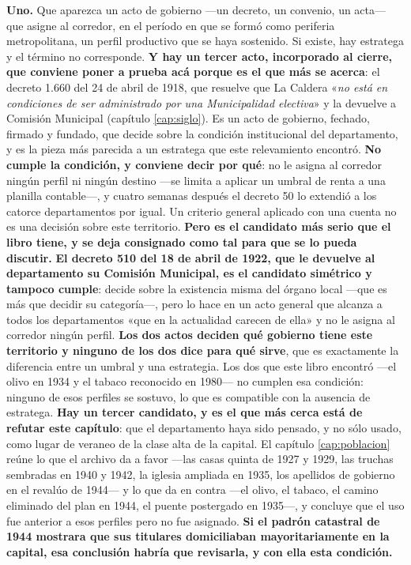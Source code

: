 \textbf{Uno.} Que aparezca un acto de gobierno ---un decreto, un convenio, un acta--- que asigne al corredor, en el período en que se formó como periferia metropolitana, un perfil productivo que se haya sostenido. Si existe, hay estratega y el término no corresponde. \textbf{Y hay un tercer acto, incorporado al cierre, que conviene poner a prueba acá porque es el
que más se acerca}: el decreto 1.660 del 24 de abril de 1918, que resuelve que La Caldera
«\textit{no está en condiciones de ser administrado por una Municipalidad electiva}» y la
devuelve a Comisión Municipal (capítulo \ref{cap:siglo}). Es un acto de gobierno, fechado,
firmado y fundado, que decide sobre la condición institucional del departamento, y es la pieza
más parecida a un estratega que este relevamiento encontró. \textbf{No cumple la condición, y
conviene decir por qué}: no le asigna al corredor ningún perfil ni ningún destino ---se limita a
aplicar un umbral de renta a una planilla contable---, y cuatro semanas después el decreto 50 lo
extendió a los catorce departamentos por igual. Un criterio general aplicado con una cuenta no es
una decisión sobre este territorio. \textbf{Pero es el candidato más serio que el libro tiene, y
se deja consignado como tal para que se lo pueda discutir.} \textbf{El decreto 510 del 18 de abril
de 1922, que le devuelve al departamento su Comisión Municipal, es el candidato simétrico y
tampoco cumple}: decide sobre la existencia misma del órgano local ---que es más que decidir su
categoría---, pero lo hace en un acto general que alcanza a todos los departamentos «que en la
actualidad carecen de ella» y no le asigna al corredor ningún perfil. \textbf{Los dos actos
deciden qué gobierno tiene este territorio y ninguno de los dos dice para qué sirve}, que es
exactamente la diferencia entre un umbral y una estrategia. Los dos que este libro encontró ---el olivo en 1934 y el tabaco reconocido en 1980--- no cumplen esa condición: ninguno de esos perfiles se sostuvo, lo que es compatible con la ausencia de estratega. \textbf{Hay un tercer candidato, y es el que más cerca está de refutar este capítulo}: que el departamento haya sido pensado, y no sólo usado, como lugar de veraneo de la clase alta de la capital. El capítulo \ref{cap:poblacion} reúne lo que el archivo da a favor ---las casas quinta de 1927 y 1929, las truchas sembradas en 1940 y 1942, la iglesia ampliada en 1935, los apellidos de gobierno en el revalúo de 1944--- y lo que da en contra ---el olivo, el tabaco, el camino eliminado del plan en 1944, el puente postergado en 1935---, y concluye que el uso fue anterior a esos perfiles pero no fue asignado. \textbf{Si el padrón catastral de 1944 mostrara que sus titulares domiciliaban mayoritariamente en la capital, esa conclusión habría que revisarla, y con ella esta condición.}

